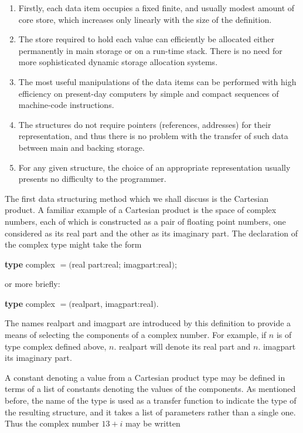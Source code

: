 \documentclass[twoside,11pt]{book}
\begin{document}
\begin{enumerate}[wide, nosep, label=(\arabic*)]
	\item Firstly, each data item occupies a fixed finite, and usually modest amount of core store, which increases only linearly with the size of the definition.

	\item The store required to hold each value can efficiently be allocated either permanently in main storage or on a run-time stack. There is no need for more sophisticated dynamic storage allocation systems.

	\item The most useful manipulations of the data items can be performed with high efficiency on present-day computers by simple and compact sequences of machine-code instructions.

	\item The structures do not require pointers (references, addresses) for their representation, and thus there is no problem with the transfer of such data between main and backing storage.

	\item For any given structure, the choice of an appropriate representation usually presents no difficulty to the programmer.
\end{enumerate}

The first data structuring method which we shall discuss is the Cartesian product. A familiar example of a Cartesian product is the space of complex numbers, each of which is constructed as a pair of floating point numbers, one considered as its real part and the other as its imaginary part. The declaration of the complex type might take the form

\quad \textbf{type} complex $= ($real part:real; imagpart:real$)$;
\nopagebreak

\noindent
or more briefly:
\nopagebreak

\quad \textbf{type} complex $= ($realpart, imagpart:real$)$.

The names realpart and imagpart are introduced by this definition to provide a means of selecting the components of a complex number. For example, if $n$ is of type complex defined above, $n$. realpart will denote its real part and $n$. imagpart its imaginary part.

A constant denoting a value from a Cartesian product type may be defined in terms of a list of constants denoting the values of the components. As mentioned before, the name of the type is used as a transfer function to indicate the type of the resulting structure, and it takes a list of parameters rather than a single one. Thus the complex number $13 + i$ may be written
\end{document}
